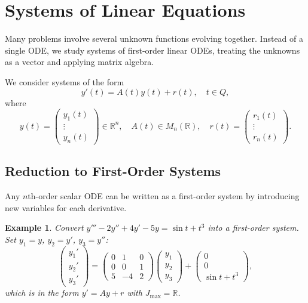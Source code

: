 \documentclass{article}
\newtheorem*{example}{Example}
\newcommand{\R}{\mathbb{R}}
\begin{document}
\section{Systems of Linear Equations}

Many problems involve several unknown functions evolving together. 
Instead of a single ODE, we study systems of first-order linear ODEs, 
treating the unknowns as a vector and applying matrix algebra.

We consider systems of the form
\begin{equation}
    \label{eq:ode-system}
    y'(t) = A(t)y(t) + r(t), \quad t \in Q,
\end{equation}
where
\[y(t) = \begin{pmatrix}y_1(t)\\\vdots\\y_n(t)\end{pmatrix} \in 
\R^n, \quad A(t) \in M_n(\R), \quad
r(t) = \begin{pmatrix}r_1(t)\\\vdots\\r_n(t)\end{pmatrix}.\]

\subsection{Reduction to First-Order Systems}

Any $n$th-order scalar ODE can be written as a first-order system 
by introducing new variables for each derivative.

\begin{example}
    Convert $y''' - 2y'' + 4y' - 5y = \sin t + t^3$ into a 
    first-order system. Set $y_1 = y$, $y_2 = y'$, $y_3 = y''$:
    \[\begin{pmatrix}y_1'\\y_2'\\y_3'\end{pmatrix} = 
    \begin{pmatrix}0&1&0\\0&0&1\\5&-4&2\end{pmatrix}
    \begin{pmatrix}y_1\\y_2\\y_3\end{pmatrix} + 
    \begin{pmatrix}0\\0\\\sin t + t^3\end{pmatrix},\]
    which is in the form $y' = Ay + r$ with $J_{\max} = \R$.
\end{example}
\end{document}
